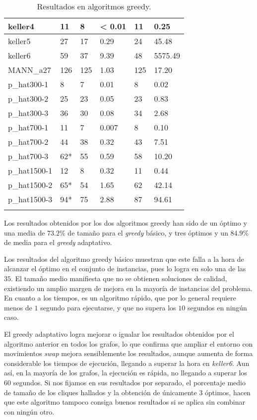 \begin{small}
\begin{longtable}{l l l l l l}
  keller4            & 11 & 8 & < 0.01 & 11 & 0.25 \\ \hline
  keller5            & 27 & 17 & 0.29 & 24 & 45.48 \\ \hline
  keller6            & 59 & 37 & 9.39 & 48 & 5575.49 \\ \hline
  MANN\_a27          & 126 & 125 & 1.03 & 125 & 17.20 \\ \hline
  p\_hat300-1        & 8 & 7 & 0.01 & 8 & 0.02 \\ \hline
  p\_hat300-2        & 25 & 23 & 0.05 & 23 & 0.83 \\ \hline
  p\_hat300-3        & 36 & 30 & 0.08 & 34 & 2.68 \\ \hline
  p\_hat700-1        & 11 & 7 & 0.007 & 8 & 0.10 \\ \hline
  p\_hat700-2        & 44 & 38 & 0.32 & 43 & 7.51 \\ \hline
  p\_hat700-3        & 62* & 55 & 0.59 & 58 & 10.20 \\ \hline
  p\_hat1500-1       & 12 & 8 & 0.32 & 11 & 0.44 \\ \hline
  p\_hat1500-2       & 65* & 54 & 1.65 & 62 & 42.14 \\ \hline
  p\_hat1500-3       & 94* & 75 & 2.88 & 87 & 94.61 \\ \hline
  \caption{Resultados en algoritmos greedy.}
\end{longtable}
\end{small}

Los resultados obtenidos por los dos algoritmos greedy han sido de un óptimo y una media
de $73.2\%$ de tamaño para el \textit{greedy} básico, y tres óptimos y un $84.9\%$ de media
para el \textit{greedy} adaptativo.

Los resultados del algoritmo greedy básico muestran que este falla a la hora de
alcanzar el óptimo en el conjunto de instancias, pues lo logra en solo una de las $35$.
El tamaño medio manifiesta que no se obtienen soluciones de calidad, existiendo
un amplio margen de mejora en la mayoría de instancias del problema. En cuanto a
los tiempos, es un algoritmo rápido, que por lo general requiere menos de $1$
segundo para ejecutarse, y que no supera los $10$ segundos en ningún caso.

El greedy adaptativo logra mejorar o igualar los resultados obtenidos por el algoritmo
anterior en todos los grafos, lo que confirma que ampliar el entorno con movimientos
\textit{swap} mejora sensiblemente los resultados, aunque aumenta de forma considerable
los tiempos de ejecución, llegando a superar la hora en \textit{keller6}. Aun así,
en la mayoría de los grafos, la ejecución es rápida, no llegando a superar los $60$
segundos. Si nos fijamos en sus resultados por separado, el porcentaje medio de tamaño
de los cliques hallados y la obtención de únicamente $3$ óptimos, hacen que este
algoritmo tampoco consiga buenos resultados si se aplica sin combinar con ningún otro.

